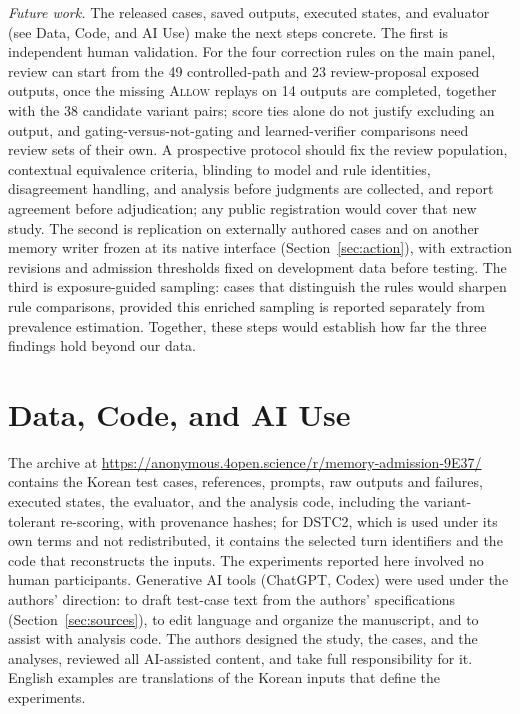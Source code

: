 \documentclass[acmsmall,review,anonymous]{acmart}
\newcommand{\allow}{\textsc{Allow}}
\begin{document}
\emph{Future work.} The released cases, saved outputs, executed states, and evaluator (see Data, Code, and AI Use) make the next steps concrete. The first is independent human validation. For the four correction rules on the main panel, review can start from the 49 controlled-path and 23 review-proposal exposed outputs, once the missing \allow{} replays on 14 outputs are completed, together with the 38 candidate variant pairs; score ties alone do not justify excluding an output, and gating-versus-not-gating and learned-verifier comparisons need review sets of their own. A prospective protocol should fix the review population, contextual equivalence criteria, blinding to model and rule identities, disagreement handling, and analysis before judgments are collected, and report agreement before adjudication; any public registration would cover that new study. The second is replication on externally authored cases and on another memory writer frozen at its native interface (Section~\ref{sec:action}), with extraction revisions and admission thresholds fixed on development data before testing. The third is exposure-guided sampling: cases that distinguish the rules would sharpen rule comparisons, provided this enriched sampling is reported separately from prevalence estimation. Together, these steps would establish how far the three findings hold beyond our data.

\section*{Data, Code, and AI Use}
The archive at \url{https://anonymous.4open.science/r/memory-admission-9E37/} contains the Korean test cases, references, prompts, raw outputs and failures, executed states, the evaluator, and the analysis code, including the variant-tolerant re-scoring, with provenance hashes; for DSTC2, which is used under its own terms and not redistributed, it contains the selected turn identifiers and the code that reconstructs the inputs. The experiments reported here involved no human participants. Generative AI tools (ChatGPT, Codex) were used under the authors' direction: to draft test-case text from the authors' specifications (Section~\ref{sec:sources}), to edit language and organize the manuscript, and to assist with analysis code. The authors designed the study, the cases, and the analyses, reviewed all AI-assisted content, and take full responsibility for it. English examples are translations of the Korean inputs that define the experiments.

\FloatBarrier

\nocite{cite1,cite2,cite3,cite4,cite5,cite6,cite7,cite8,cite9,cite10,cite11,cite12,cite13,cite14,cite15,cite16,cite17,cite18,cite19,cite20,cite21,cite22,cite23,cite24,cite25,cite26,cite27,cite28,cite29,cite30,cite31,cite32,cite33,cite34,cite35,cite36,cite37,cite38,cite39,cite40,cite41,cite42,cite43,cite44,cite45,cite46,cite47,cite48,cite49,cite50,cite51,cite52,cite53,cite54,cite55,cite56,cite57,cite58}

\end{document}
